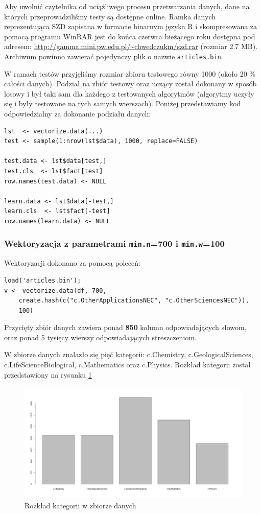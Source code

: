 \documentclass[a4paper,12pt]{article}
\begin{document}
		Aby uwolnić czytelnika od uciążliwego procesu przetwarzania 
		danych, dane na których przeprowadziliśmy testy są 
		dostępne online.
		Ramka danych reprezentująca SZD
		zapisana w formacie binarnym języka R i skompresowana
		za pomocą programu WinRAR jest do końca czerwca bieżącego roku
		dostępna pod adresem: \url{http://gamma.mini.pw.edu.pl/~chwedczukm/szd.rar}
		(rozmiar 2.7 MB). Archiwum powinno zawierać pojedynczy plik o nazwie
		\texttt{articles.bin}.
		
		W ramach testów przyjęliśmy rozmiar zbioru testowego równy 1000
		(około 20 \% całości danych).
		Podział na zbiór testowy oraz uczący został dokonany w sposób
		losowy i był taki sam dla każdego z testowanych algorytmów
		(algorytmy uczyły się i były testowane na tych samych wierszach).
		Poniżej przedstawiamy kod odpowiedzialny za dokonanie 
		podziału danych:
		\begin{verbatim}
lst  <- vectorize.data(...)
test <- sample(1:nrow(lst$data), 1000, replace=FALSE)

test.data <- lst$data[test,]
test.cls  <- lst$fact[test]
row.names(test.data) <- NULL

learn.data <- lst$data[-test,]
learn.cls  <- lst$fact[-test]
row.names(learn.data) <- NULL
		\end{verbatim}
		
		\subsubsection{Wektoryzacja z parametrami \texttt{min.n}=700 i
		 \texttt{min.w}=100}
		 
		 Wektoryzacji dokonano za pomocą poleceń:
		 \begin{verbatim}
load('articles.bin');
v <- vectorize.data(df, 700, 
	create.hash(c("c.OtherApplicationsNEC", "c.OtherSciencesNEC")),
	100) 
		 \end{verbatim}
		 
		 Przycięty zbiór danych zawiera ponad \textbf{850} kolumn odpowiadających słowom,
		 oraz ponad 5 tysięcy wierszy odpowiadających streszczeniom.
		 
		 W zbiorze danych znalazło się pięć kategorii: c.Chemistry, 		 
		 c.GeologicalSciences, c.LifeScienceBiological, c.Mathematics
		 oraz c.Physics. Rozkład kategorii został przedstawiony na 
		 rysunku \ref{fig:v1hist}
		 \begin{figure}[!h]
		 	\centering
		 		\includegraphics[width=\textwidth]{./img/v1_cats}
		 	\caption{Rozkład kategorii w zbiorze danych}
		 	\label{fig:v1hist}
		 \end{figure}
		 
\end{document}
